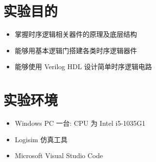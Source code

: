 \documentclass[UTF8,fontset=fandol]{ctexart}
\begin{document}
\section*{实验目的}
\begin{itemize}
  \item 掌握时序逻辑相关器件的原理及底层结构
  \item 能够用基本逻辑门搭建各类时序逻辑器件
  \item 能够使用 Verilog HDL 设计简单时序逻辑电路
\end{itemize}
\section*{实验环境}
\begin{itemize}
  \item Windows PC 一台: CPU 为 Intel i5-1035G1
  \item Logisim 仿真工具
  \item Microsoft Visual Studio Code
\end{itemize}
\end{document}
